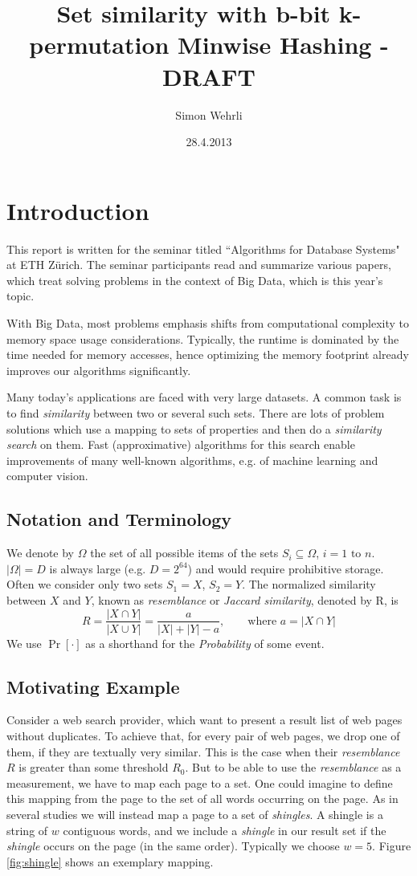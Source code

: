 \documentclass[a4paper]{article}
\author{Simon Wehrli}
\date{28.4.2013}
\title{Set similarity with b-bit k-permutation Minwise Hashing - DRAFT}
\begin{document}
 
\maketitle

\section{Introduction}
This report is written for the seminar titled ``Algorithms for Database Systems" at ETH Z\"{u}rich. The seminar participants read and summarize various papers, which treat solving problems in the context of Big Data, which is this year's topic.

With Big Data, most problems emphasis shifts from computational complexity to memory space usage considerations. Typically, the runtime is dominated by the time needed for memory accesses, hence optimizing the memory footprint already improves our algorithms significantly. 

Many today's applications are faced with very large datasets. A common task is to find \emph{similarity} between two or several such sets. There are lots of problem solutions which use a mapping to sets of properties and then do a \emph{similarity search} on them. Fast (approximative) algorithms for this search enable improvements of many well-known algorithms, e.g. of machine learning and computer vision.

\subsection{Notation and Terminology}
We denote by $\Omega$ the set of all possible items of the sets $S_i \subseteq \Omega$, $i = 1 \text{ to } n$. $\left| \Omega \right| = D$ is always large (e.g. $D=2^{64}$) and would require prohibitive storage. Often we consider only two sets $S_1 = X$, $S_2 = Y$. The normalized similarity between $X$ and $Y$, known as \emph{resemblance} or \emph{Jaccard similarity}, denoted by R, is
\[
R=\frac{\left| X \cap Y \right|}{\left| X \cup Y \right|} = \frac{a}{\left| X \right| + \left| Y \right| -a}, \qquad \text{where } a=\left| X \cap Y \right|
\]
We use $\Pr[\cdot]$ as a shorthand for the \emph{Probability} of some event.

\subsection{Motivating Example}
Consider a web search provider, which want to present a result list of web pages without duplicates. To achieve that, for every pair of web pages, we drop one of them, if they are textually very similar. This is the case when their \emph{resemblance} $R$ is greater than some threshold $R_0$. But to be able to use the \emph{resemblance} as a measurement, we have to map each page to a set. One could imagine to define this mapping from the page to the set of all words occurring on the page. As in several studies \citep{Broder:1998,BroderGMZ97} we will instead map a page to a set of \emph{shingles}. A shingle is a string of $w$ contiguous words, and we include a \emph{shingle} in our result set if the \emph{shingle} occurs on the page (in the same order). Typically we choose $w = 5$. Figure \vref{fig:shingle} shows an exemplary mapping.
\end{document}
